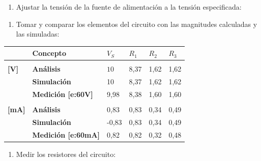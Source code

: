 \begin{enumerate}[resume]
    \item Ajustar la tensión de la fuente de alimentación a la tensión especificada: 
\end{enumerate}
\begin{enumerate}[resume]
    \item Tomar y comparar los elementos del circuito con las magnitudes calculadas y las simuladas:
\end{enumerate}
\begin{minipage}{\textwidth}
\small
\renewcommand{\arraystretch}{1.5}
\begin{tabular}{ 
    >{\centering\arraybackslash}m{1.1cm}
    >{\centering\arraybackslash}m{1.2cm} 
    >{\centering\arraybackslash}m{0.8cm} 
    >{\centering\arraybackslash}m{0.8cm} 
    >{\centering\arraybackslash}m{0.8cm} 
    >{\centering\arraybackslash}m{0.8cm}}
    \hline
    {\centering\textbf{Magnitud}} &
    {\textbf{Concepto}} &
    {\textbf{$V_S$}} &
    {\textbf{$R_1$}} &
    {\textbf{$R_2$}} &
    {\textbf{$R_3$}} \\
    \hline
    {\multirow{4}{*}{\centering\shortstack{\textbf{Tensión} \\ \textbf{[V]}}}} &
    {\textbf{Análisis}} &
    {$10$} &
    {8,37} &
    {1,62} &
    {1,62} \\[10pt]
                                          &
    {\textbf{Simulación}} &
    {10} &
    {8,37} &
    {1,62} &
    {1,62} \\[10pt]
                                          &
    {\textbf{Medición [e:60V]}} &
    {9,98} &
    {8,38} &
    {1,60} &
    {1,60} \\[10pt]
    \hline
    {\multirow{4}{*}{\centering\shortstack{\textbf{Corriente} \\ \textbf{[mA]}}}} &
    {\textbf{Análisis}} &
    {0,83} &
    {0,83} &
    {0,34} &
    {0,49} \\[10pt]
                                          &
    {\textbf{Simulación}} &
    {-0,83} &
    {0,83} &
    {0,34} &
    {0,49} \\[10pt]
                                          &
    {\textbf{Medición [e:60mA]}} &
    {0,82} &
    {0,82} &
    {0,32} &
    {0,48} \\
    \hline

\end{tabular}
\end{minipage}
\saltoPag{}
\begin{enumerate}[resume]
    \item Medir los resistores del circuito:
\end{enumerate}

